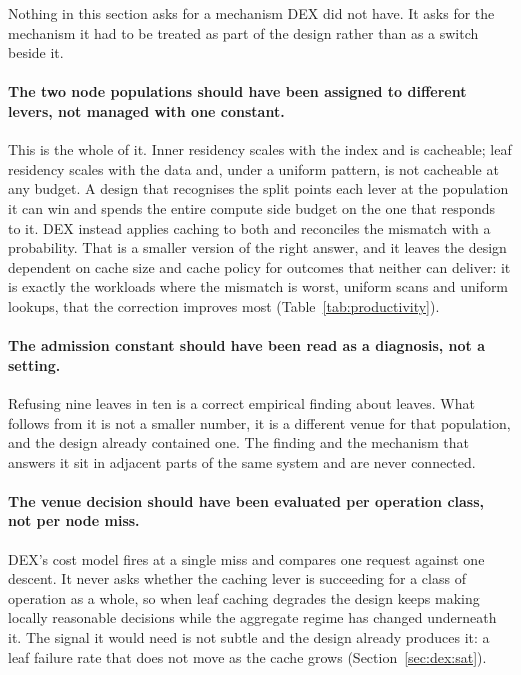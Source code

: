 \documentclass[sigconf,nonacm]{acmart}
\begin{document}
Nothing in this section asks for a mechanism DEX did not have. It asks for the
mechanism it had to be treated as part of the design rather than as a switch
beside it.

\paragraph{The two node populations should have been assigned to different
levers, not managed with one constant.}
This is the whole of it. Inner residency scales with the index and is cacheable;
leaf residency scales with the data and, under a uniform pattern, is not
cacheable at any budget. A design that recognises the split points each lever at
the population it can win and spends the entire compute side budget on the one
that responds to it. DEX instead applies caching to both and reconciles the
mismatch with a probability. That is a smaller version of the right answer, and
it leaves the design dependent on cache size and cache policy for outcomes that
neither can deliver: it is exactly the workloads where the mismatch is worst,
uniform scans and uniform lookups, that the correction improves most
(Table~\ref{tab:productivity}).

\paragraph{The admission constant should have been read as a diagnosis, not a
setting.}
Refusing nine leaves in ten is a correct empirical finding about leaves. What
follows from it is not a smaller number, it is a different venue for that
population, and the design already contained one. The finding and the mechanism
that answers it sit in adjacent parts of the same system and are never connected.

\paragraph{The venue decision should have been evaluated per operation class, not
per node miss.}
DEX's cost model fires at a single miss and compares one request against one
descent. It never asks whether the caching lever is succeeding for a class of
operation as a whole, so when leaf caching degrades the design keeps making
locally reasonable decisions while the aggregate regime has changed underneath
it. The signal it would need is not subtle and the design already produces it: a
leaf failure rate that does not move as the cache grows
(Section~\ref{sec:dex:sat}).
\end{document}
